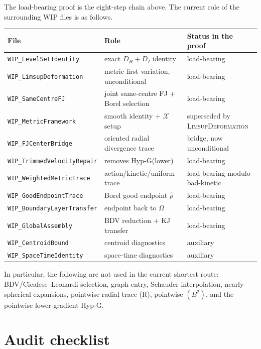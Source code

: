 \documentclass[11pt]{article}
\theoremstyle{definition}
\newcommand{\Om}{\Omega}
\newcommand{\X}{\mathcal X}
\newcommand{\rhad}{\widehat\rho}
\begin{document}
The load-bearing proof is the eight-step chain above.  The current role
of the surrounding WIP files is as follows.

\begin{center}
\renewcommand{\arraystretch}{1.18}
\begin{tabular}{@{}lll@{}}
\toprule
File & Role & Status in the proof \\
\midrule
\texttt{WIP\_LevelSetIdentity} & exact $D_H+D_I$ identity & load-bearing \\
\texttt{WIP\_LimsupDeformation} & metric first variation, unconditional & load-bearing \\
\texttt{WIP\_SameCentreFJ} & joint same-centre FJ + Borel selection & load-bearing \\
\texttt{WIP\_MetricFramework} & smooth identity + $\X$ setup & superseded by \textsc{LimsupDeformation} \\
\texttt{WIP\_FJCenterBridge} & oriented radial divergence trace & bridge, now unconditional \\
\texttt{WIP\_TrimmedVelocityRepair} & removes Hyp-G(lower) & load-bearing \\
\texttt{WIP\_WeightedMetricTrace} & action/kinetic/uniform trace & load-bearing modulo bad-kinetic \\
\texttt{WIP\_GoodEndpointTrace} & Borel good endpoint $\rhad$ & load-bearing \\
\texttt{WIP\_BoundaryLayerTransfer} & endpoint back to $\Om$ & load-bearing \\
\texttt{WIP\_GlobalAssembly} & BDV reduction + KJ transfer & load-bearing \\
\texttt{WIP\_CentroidBound} & centroid diagnostics & auxiliary \\
\texttt{WIP\_SpaceTimeIdentity} & space-time diagnostics & auxiliary \\
\bottomrule
\end{tabular}
\end{center}

In particular, the following are not used in the current shortest
route: BDV/Cicalese--Leonardi selection, graph entry, Schauder
interpolation, nearly-spherical expansions, pointwise radial trace
(R), pointwise $(B^2)$, and the pointwise lower-gradient Hyp-G.

\section{Audit checklist}
\end{document}
